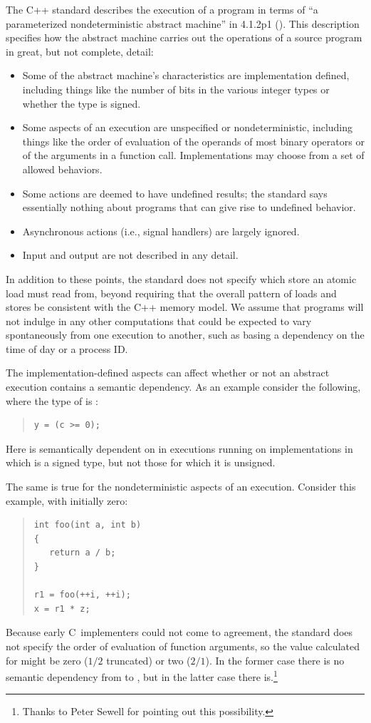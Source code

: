 \documentclass[10]{article}
\begin{document}
The C++ standard describes the execution of a program in terms of
``a parameterized nondeterministic abstract machine'' in 4.1.2p1
().
This description specifies how the abstract machine carries out the
operations of a source program in great, but not complete, detail:
\begin{itemize}
\item	Some of the abstract machine's characteristics are
	implementation defined, including things like the number of
	bits in the various integer types
	or whether the  type is signed.
\item	Some aspects of an execution are unspecified or nondeterministic,
	including things like the order of evaluation of the operands
	of most binary operators or of the arguments in a function call.
	Implementations may choose from a set of allowed behaviors.
\item	Some actions are deemed to have undefined results; the standard
	says essentially nothing about programs that can give rise to
	undefined behavior.
\item	Asynchronous actions (i.e., signal handlers) are largely ignored.
\item	Input and output are not described in any detail.
\end{itemize}
In addition to these points, the standard does not specify which store
an atomic load must read from, beyond requiring that the overall
pattern of loads and stores be consistent with the C++ memory model.
We assume that programs will not indulge in any other computations that
could be expected to vary spontaneously from one execution to another,
such as basing a dependency on the time of day or a process ID.

The implementation-defined aspects can affect whether or not an
abstract execution contains a semantic dependency.
As an example consider the following, where the type of  is :
\begin{quote}
\begin{verbatim}
y = (c >= 0);
\end{verbatim}
\end{quote}
Here  is semantically dependent on  in executions
running on implementations in
which  is a signed type,
but not those for which it is unsigned.

The same is true for the nondeterministic aspects of an execution.
Consider this example, with  initially zero:
\begin{quote}
\begin{verbatim}
int foo(int a, int b)
{
   return a / b;
}

r1 = foo(++i, ++i);
x = r1 * z;
\end{verbatim}
\end{quote}
Because early C~implementers could not come to agreement, the standard
does not specify the order of evaluation of function arguments, so
the value calculated for  might be zero ($1/2$ truncated) or two
($2/1$).
In the former case there is no semantic dependency from  to ,
but in the latter case there is.\footnote{
	Thanks to Peter Sewell for pointing out this possibility.}
\end{document}
